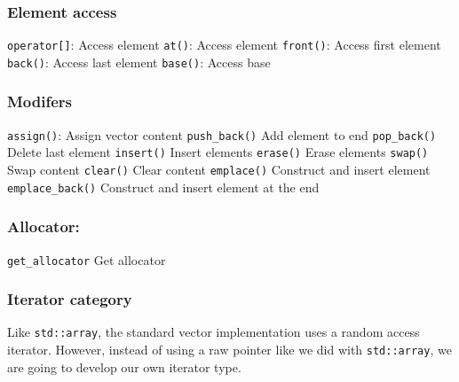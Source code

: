 \documentclass{report}
\begin{document}
\hspace{5mm}\begin{minipage}{0.5\textwidth}
  \subsubsection*{Element access}	
  \texttt{operator[]}: Access element
  \bigbreak \noindent
  \texttt{at()}: Access element
  \bigbreak \noindent
  \texttt{front()}: Access first element
  \bigbreak \noindent
  \texttt{back()}: Access last element
  \bigbreak \noindent
  \texttt{base()}: Access base
  \bigbreak \noindent
  \subsubsection*{Modifers}
  \texttt{assign()}: Assign vector content
  \bigbreak\noindent
  \texttt{push\_back()} Add element to end
  \bigbreak\noindent
  \texttt{pop\_back()} Delete last element
  \bigbreak\noindent
  \texttt{insert()} Insert elements
  \bigbreak\noindent
  \texttt{erase()} Erase elements
  \bigbreak\noindent
  \texttt{swap()} Swap content
  \bigbreak\noindent
  \texttt{clear()} Clear content
  \bigbreak\noindent 
  \texttt{emplace()} Construct and insert element
  \bigbreak\noindent
  \texttt{emplace\_back()} Construct and insert element at the end
  \bigbreak\noindent
  \subsubsection*{Allocator:}
  \texttt{get\_allocator} Get allocator
\end{minipage}
\subsubsection*{Iterator category}
Like \texttt{std::array}, the standard vector implementation uses a random access iterator. However, instead of using a raw pointer like we did with \texttt{std::array}, we are going to develop our own iterator type.
\end{document}
